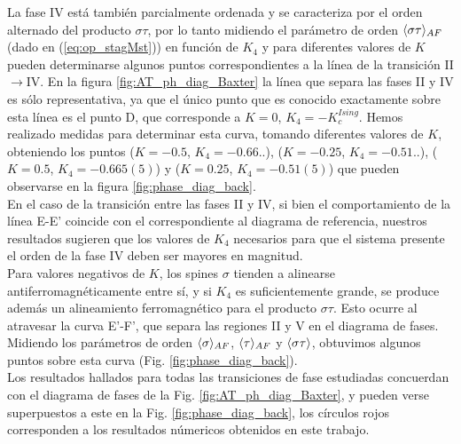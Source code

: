 La fase IV está también parcialmente ordenada y se caracteriza por el orden alternado del producto $\sigma\tau$, por lo tanto midiendo el parámetro de orden $\langle \sigma\tau \rangle_{AF}$
 (dado en (\ref{eq:op_stagMst})) en función de $K_{4}$ y para diferentes valores de $K$ pueden determinarse algunos puntos correspondientes a la línea de la transición II$\rightarrow$IV.
 En la figura \ref{fig:AT_ph_diag_Baxter} la línea que separa las fases II y IV es sólo representativa, ya que el único punto que es conocido exactamente sobre esta línea es el punto D,
 que corresponde a $K=0$, $K_{4}=-K_{c}^{Ising}$. Hemos realizado medidas para determinar esta curva, tomando diferentes valores de $K$, obteniendo los puntos
 ($K=-0.5$, $K_{4}=-0.66..$), ($K=-0.25$, $K_{4}=-0.51..$), ($K=0.5$, $K_{4}=-0.665(5)$) y ($K=0.25$, $K_{4}=-0.51(5)$) que pueden observarse en la figura \ref{fig:phase_diag_back}.\\

En el caso de la transici\'on entre las fases II y IV, si bien el comportamiento de la l\'inea E-E' coincide con el correspondiente
 al diagrama de referencia, nuestros resultados sugieren que los valores de $K_{4}$ necesarios para que el sistema presente el orden de la fase IV
 deben ser mayores en magnitud.\\

Para valores negativos de $K$, los spines $\sigma$ tienden a alinearse antiferromagnéticamente entre sí, y si $K_{4}$ es suficientemente grande, se produce además un alineamiento 
ferromagnético para el producto $\sigma\tau$. Esto ocurre al atravesar la curva E'-F', que separa las regiones II y V en el diagrama de fases. Midiendo los parámetros de orden
 $\langle \sigma \rangle_{AF}$, $\langle \tau \rangle_{AF}$ y $\langle \sigma\tau \rangle$, obtuvimos algunos puntos sobre esta curva (Fig. \ref{fig:phase_diag_back}).\\


Los resultados hallados para todas las transiciones de fase estudiadas concuerdan con el diagrama de fases de la Fig. \ref{fig:AT_ph_diag_Baxter},
 y pueden verse superpuestos a este en la Fig. \ref{fig:phase_diag_back}, los c\'irculos rojos corresponden a los resultados n\'umericos obtenidos
 en este trabajo.\\
\newpage
